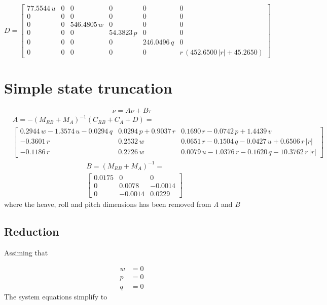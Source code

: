 \documentclass[12pt,a4]{article}
\begin{document}
\begin{equation*}
	D = \left[\begin{array}{cccccc} 77.5544\,u & 0 & 0 & 0 & 0 & 0\\ 0 & 0 & 0 & 0 & 0 & 0\\ 0 & 0 & 546.4805\,w & 0 & 0 & 0\\ 0 & 0 & 0 & 54.3823\,p & 0 & 0\\ 0 & 0 & 0 & 0 & 246.0496\,q & 0\\ 0 & 0 & 0 & 0 & 0 & r\,\left(452.6500\,\left|r\right|+45.2650\right) \end{array}\right]
\end{equation*}

\section{Simple state truncation}
\begin{equation*}
	\dot{\nu} = A \nu + B \tau
\end{equation*}
\begin{align*}
	 & A =  -(M_{RB} + M_A)^{-1}(C_{RB}+C_A+D)= \\
	 & \left[\begin{array}{ccc} 0.2944\,w-1.3574\,u-0.0294\,q & 0.0294\,p+0.9037\,r & 0.1690\,r-0.0742\,p+1.4439\,v\\ -0.3601\,r & 0.2532\,w & 0.0651\,r-0.1504\,q-0.0427\,u+0.6506\,r\,\left|r\right|\\ -0.1186\,r & 0.2726\,w & 0.0079\,u-1.0376\,r-0.1620\,q-10.3762\,r\,\left|r\right| \end{array}\right]
\end{align*}
\begin{align*}
	 & B = (M_{RB} + M_A)^{-1}=               \\
	 & \left[\begin{array}{ccc} 0.0175 & 0 & 0\\ 0 & 0.0078 & -0.0014\\ 0 & -0.0014 & 0.0229 \end{array}\right]
\end{align*}
where the heave, roll and pitch dimensions has been removed from \textit{A} and \textit{B}

\subsection{Reduction}

Assiming that

\begin{align*}
	w & = 0 \\
	p & = 0 \\
	q & = 0
\end{align*}
The system equations simplify to
\end{document}
